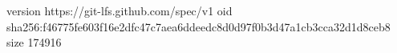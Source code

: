 version https://git-lfs.github.com/spec/v1
oid sha256:f46775fe603f16e2dfc47c7aea6ddeedc8d0d97f0b3d47a1cb3cca32d1d8ceb8
size 174916
